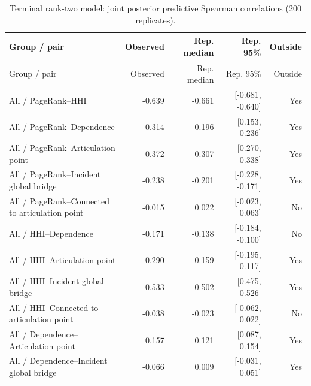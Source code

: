 \documentclass[pdftex,12pt,openright,a4paper,oneside]{book}
\begin{document}
\begin{longtable}{@{}p{}rrrr@{}}

\caption{Terminal rank-two model: joint posterior predictive Spearman correlations (200 replicates).}\label{tab:terminal_rank2_ppc_joint}\\

\toprule

Group / pair & Observed & Rep. median & Rep. 95\% & Outside \\

\midrule\endfirsthead

\toprule

Group / pair & Observed & Rep. median & Rep. 95\% & Outside \\

\midrule\endhead

All / PageRank--HHI & -0.639 & -0.661 & [-0.681, -0.640] & Yes \\

All / PageRank--Dependence & 0.314 & 0.196 & [0.153, 0.236] & Yes \\

All / PageRank--Articulation point & 0.372 & 0.307 & [0.270, 0.338] & Yes \\

All / PageRank--Incident global bridge & -0.238 & -0.201 & [-0.228, -0.171] & Yes \\

All / PageRank--Connected to articulation point & -0.015 & 0.022 & [-0.023, 0.063] & No \\

All / HHI--Dependence & -0.171 & -0.138 & [-0.184, -0.100] & No \\

All / HHI--Articulation point & -0.290 & -0.159 & [-0.195, -0.117] & Yes \\

All / HHI--Incident global bridge & 0.533 & 0.502 & [0.475, 0.526] & Yes \\

All / HHI--Connected to articulation point & -0.038 & -0.023 & [-0.062, 0.022] & No \\

All / Dependence--Articulation point & 0.157 & 0.121 & [0.087, 0.154] & Yes \\

All / Dependence--Incident global bridge & -0.066 & 0.009 & [-0.031, 0.051] & Yes \\


\end{longtable}
\end{document}
